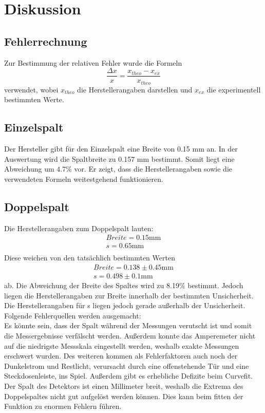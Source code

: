 \section{Diskussion}
\label{sec:Diskussion}
\subsection{Fehlerrechnung}
    Zur Bestimmung der relativen Fehler wurde die Formeln
    \begin{equation*}
        \dfrac{\Delta x}{x}=\dfrac{x_{theo}-x_{ex}}{x_{theo}}
    \end{equation*}
    verwendet, wobei $x_{theo}$ die Herstellerangaben darstellen und $x_{ex}$ die 
    experimentell bestimmten Werte.

\subsection{Einzelspalt}
    Der Hersteller gibt für den Einzelspalt eine Breite von 0.15 mm an. In der Auswertung wird
    die Spaltbreite zu 0.157 mm bestimmt. Somit liegt eine Abweichung um $ 4.7 \% $ vor. Er zeigt, dass die 
    Herstellerangaben sowie die verwendeten Formeln weitestgehend funktionieren.
    
\subsection{Doppelspalt}
    Die Herstellerangaben zum Doppelspalt lauten:
    \begin{align*}
        Breite = 0.15 \si{\milli\metre}\\
        s = 0.65 \si{\milli\metre}\\
    \end{align*}
    Diese weichen von den tatsächlich bestimmten Werten 
    \begin{align*}
        Breite = 0.138 \pm 0.45 \si{\milli\metre}\\
        s = 0.498 \pm 0.1 \si{\milli\metre}
    \end{align*}
    ab. Die Abweichung der Breite des Spaltes wird zu 8.19\% bestimmt. Jedoch liegen
    die Herstellerangaben zur Breite innerhalb der bestimmten Unsicherheit. Die
    Herstellerangaben für s liegen jedoch gerade außerhalb der Unsicherheit. Folgende 
    Fehlerquellen werden ausgemacht:\\
    Es könnte sein, dass 
    der Spalt während der Messungen verutscht ist und somit die Messergebnisse verfälscht werden.
    Außerdem konnte das Amperemeter nicht auf die niedrigste Messskala eingestellt werden, weshalb
    exakte Messungen erschwert wurden. Des weiteren kommen als Fehlerfaktoren auch noch der 
    Dunkelstrom und Restlicht, verursacht durch eine offenstehende Tür und eine Steckdosenleiste, 
    ins Spiel.
    Außerdem gibt es erhebliche Defizite beim Curvefit. Der Spalt des Detektors ist einen Millimeter 
    breit, weshalb die Extrema des Doppelspaltes nicht gut aufgelöst werden können. Dies kann beim 
    fitten der Funktion zu enormen Fehlern führen.


